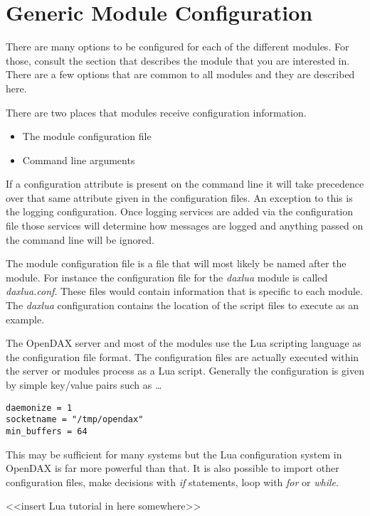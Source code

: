 \section{Generic Module Configuration}
There are many options to be configured for each of the different modules.  For those, consult the section that describes the module that you are interested in.  There are a few options that are common to all modules and they are described here.

There are two places that modules receive configuration information.

\begin{itemize}
\item The module configuration file
\item Command line arguments
\end{itemize}

If a configuration attribute is present on the command line it will take precedence over that same attribute given in the configuration files.  An exception to this is the logging configuration.  Once logging services are added via the configuration file those services will determine how messages are logged and anything passed on the  command line will be ignored.

The module configuration file is a file that will most likely be named after the module.  For instance the configuration file for the \emph{daxlua} module is called \emph{daxlua.conf}.  These files would contain information that is specific to each module.  The \emph{daxlua} configuration contains the location of the script files to execute as an example.

The OpenDAX server and most of the modules use the Lua scripting language as the configuration file format.  The configuration files are actually executed within the server or modules process as a Lua script.  Generally the configuration is given by simple key/value pairs such as \ldots

\begin{verbatim}
daemonize = 1
socketname = "/tmp/opendax"
min_buffers = 64
\end{verbatim}

This may be sufficient for many systems but the Lua configuration system in OpenDAX is far more powerful than that.  It is also possible to import other configuration files, make decisions with \emph{if} statements, loop with \emph{for} or \emph{while}.

<<insert Lua tutorial in here somewhere>>

